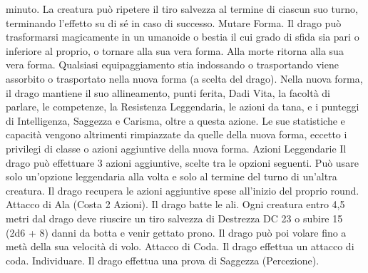 \begin{multicols}{2}
minuto. La creatura può ripetere il tiro salvezza al termine di ciascun
suo turno, terminando l’effetto su di sé in caso di successo.
Mutare Forma. Il drago può trasformarsi magicamente in un
umanoide o bestia il cui grado di sfida sia pari o inferiore al proprio,
o tornare alla sua vera forma. Alla morte ritorna alla sua vera forma.
Qualsiasi equipaggiamento stia indossando o trasportando viene
assorbito o trasportato nella nuova forma (a scelta del drago).
Nella nuova forma, il drago mantiene il suo allineamento, punti
ferita, Dadi Vita, la facoltà di parlare, le competenze, la Resistenza
Leggendaria, le azioni da tana, e i punteggi di Intelligenza, Saggezza
e Carisma, oltre a questa azione. Le sue statistiche e capacità
vengono altrimenti rimpiazzate da quelle della nuova forma, eccetto i
privilegi di classe o azioni aggiuntive della nuova forma.
Azioni Leggendarie
Il drago può effettuare 3 azioni aggiuntive, scelte tra le opzioni
seguenti. Può usare solo un’opzione leggendaria alla volta e solo
al termine del turno di un’altra creatura. Il drago recupera le
azioni aggiuntive spese all’inizio del proprio round.
Attacco di Ala (Costa 2 Azioni). Il drago batte le ali. Ogni
creatura entro 4,5 metri dal drago deve riuscire un tiro salvezza
di Destrezza DC 23 o subire 15 (2d6 + 8) danni da botta e
venir gettato prono. Il drago può poi volare fino a metà della sua
velocità di volo.
Attacco di Coda. Il drago effettua un attacco di coda.
Individuare. Il drago effettua una prova di Saggezza
(Percezione).
 

\end{multicols}
